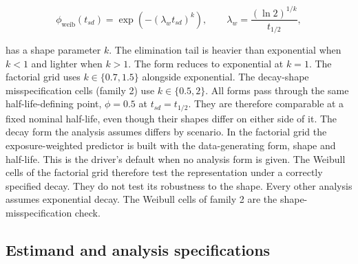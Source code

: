 \documentclass[
  11pt,
]{article}
\begin{document}
\[\phi_{\text{weib}}(t_{sd}) =
  \exp\left(-\left(\lambda_w t_{sd}\right)^{k}\right), \qquad
  \lambda_w = \frac{(\ln 2)^{1/k}}{t_{1/2}},\]

has a shape parameter \(k\). The elimination tail is heavier than
exponential when \(k < 1\) and lighter when \(k > 1\). The form reduces
to exponential at \(k = 1\). The factorial grid uses \(k \in \{0.7,
1.5\}\) alongside exponential. The decay-shape misspecification cells
(family 2) use \(k \in \{0.5, 2\}\). All forms pass through the same
half-life-defining point, \(\phi = 0.5\) at \(t_{sd} = t_{1/2}\). They are
therefore comparable at a fixed nominal half-life, even though their
shapes differ on either side of it. The decay form the analysis
assumes differs by scenario. In the factorial grid the
exposure-weighted predictor is built with the data-generating form,
shape and half-life. This is the driver's default when no analysis
form is given. The Weibull cells of the factorial grid therefore test
the representation under a correctly specified decay. They do not
test its robustness to the shape. Every other analysis assumes
exponential decay. The Weibull cells of family 2 are the
shape-misspecification check.

\subsection{Estimand and analysis specifications}\label{sec-spec}
\end{document}
